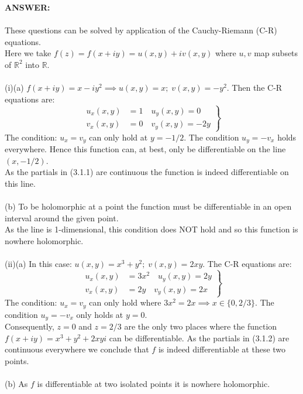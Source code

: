 \documentclass[12pt,a4paper]{article}
\begin{document}
\textbf{ANSWER:}\\
\\
{\color{red}
These questions can be solved by application of the Cauchy-Riemann (C-R) equations.\\
Here we take $f(z)=f(x+iy)=u(x,y) + iv(x,y)$ where $u,v$ map subsets of $\mathbb{R}^2$ into $\mathbb{R}$.}\\
\\
(i)(a) $f(x+iy)=x-iy^2 \implies u(x,y)=x; \; v(x,y)=-y^2$. Then the C-R equations are:
\begin{equation*}
\left.
\begin{aligned}
    u_x(x,y) &= 1 \quad u_y(x,y) = 0 \\
    v_x(x,y) &= 0 \quad v_y(x,y) = -2y
\end{aligned}
\right\}
\tag{3.1.1}
\end{equation*}
The condition: $u_x = v_y$ can only hold at $y=-1/2$.  The condition $u_y=-v_x$ holds everywhere.
Hence this function can, at best, only be differentiable on the line $(x,-1/2)$.\\
As the partials in (3.1.1) are continuous the function is indeed differentiable on this line.\\
\\
(b) To be holomorphic at a point the function must be differentiable in an open interval around the given point.\\
As the line is 1-dimensional, this condition does NOT hold and so this function is nowhere holomorphic.\\
\\
(ii)(a) In this case: $u(x,y)=x^3 + y^2; \; v(x,y)=2xy$.  The C-R equations are:
\begin{equation*}
\left.
\begin{aligned}
    u_x(x,y) &= 3x^2 \quad u_y(x,y) = 2y \\
    v_x(x,y) &= 2y \quad v_y(x,y) = 2x
\end{aligned}
\right\}
\tag{3.1.2}
\end{equation*}
The condition: $u_x = v_y$ can only hold where $3x^2=2x \implies x \in \{0,2/3\}$. The condition $u_y=-v_x$ only holds at $y=0$.\\
Consequently, $z=0$ and $z=2/3$ are the only two places where the function $f(x+iy)=x^3+y^2+2xyi$ can be differentiable.  As the partials
in (3.1.2) are continuous everywhere we conclude that $f$ is indeed differentiable at these two points.\\
\\
(b) As $f$ is differentiable at two isolated points it is nowhere holomorphic.\\
\end{document}
